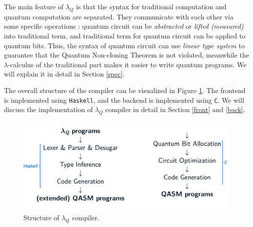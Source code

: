 The main feature of $\lambda_Q$ is that the syntax for traditional computation and quantum computation are separated.
They communicate with each other via some specific operations : quantum circuit can be \textit{abstracted} or \textit{lifted (measured)} into traditional term, and traditional term for quantum circuit can be applied to quantum bits.
Thus, the syntax of quantum circuit can use \textit{linear type system} to guarantee that the Quantum Non-cloning Theorem is not violated, meanwhile the $\lambda$-calculus of the traditional part makes it easier to write quantum programs.
We will explain it in detail in Section \ref{spec}.

The overall structure of the compiler can be visualized in Figure \ref{compiler}.
The frontend is implemented using \texttt{Haskell}, and the backend is implemented using \texttt{C}.
We will discuss the implementation of $\lambda_Q$ compiler in detail in Section \ref{front} and \ref{back}.


\begin{center}
  \begin{figure}
    \label{compiler}
    \centering
    \includegraphics[width=0.9\linewidth]{images/overview.png}
    \caption{Structure of $\lambda_Q$ compiler.}
  \end{figure}
\end{center}